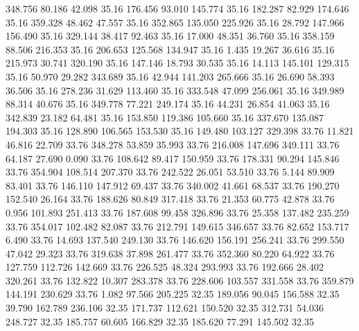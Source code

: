  348.756   80.186   42.098        35.16
 176.456   93.010  145.774        35.16
 182.287   82.929  174.646        35.16
 359.328   48.462   47.557        35.16
 352.865  135.050  225.926        35.16
  28.792  147.966  156.490        35.16
 329.144   38.417   92.463        35.16
  17.000   48.351   36.760        35.16
 358.159   88.506  216.353        35.16
 206.653  125.568  134.947        35.16
   1.435   19.267   36.616        35.16
 215.973   30.741  320.190        35.16
 147.146   18.793   30.535        35.16
  14.113  145.101  129.315        35.16
  50.970   29.282  343.689        35.16
  42.944  141.203  265.666        35.16
  26.690   58.393   36.506        35.16
 278.236   31.629  113.460        35.16
 333.548   47.099  256.061        35.16
 349.989   88.314   40.676        35.16
 349.778   77.221  249.174        35.16
  44.231   26.854   41.063        35.16
 342.839   23.182   64.481        35.16
 153.850  119.386  105.660        35.16
 337.670  135.087  194.303        35.16
 128.890  106.565  153.530        35.16
 149.480  103.127  329.398        33.76
  11.821   46.816   22.709        33.76
 348.278   53.859   35.993        33.76
 216.008  147.696  349.111        33.76
  64.187   27.690    0.090        33.76
 108.642   89.417  150.959        33.76
 178.331   90.294  145.846        33.76
 354.904  108.514  207.370        33.76
 242.522   26.051   53.510        33.76
   5.144   89.909   83.401        33.76
 146.110  147.912   69.437        33.76
 340.002   41.661   68.537        33.76
 190.270  152.540   26.164        33.76
 188.626   80.849  317.418        33.76
  21.353   60.775   42.878        33.76
   0.956  101.893  251.413        33.76
 187.608   99.458  326.896        33.76
  25.358  137.482  235.259        33.76
 354.017  102.482   82.087        33.76
 212.791  149.615  346.657        33.76
  82.652  153.717    6.490        33.76
  14.693  137.540  249.130        33.76
 146.620  156.191  256.241        33.76
 299.550   47.042   29.323        33.76
 319.638   37.898  261.477        33.76
 352.360   80.220   64.922        33.76
 127.759  112.726  142.669        33.76
 226.525   48.324  293.993        33.76
 192.666   28.402  320.261        33.76
 132.822   10.307  283.378        33.76
 228.606  103.557  331.558        33.76
 359.879  144.191  230.629        33.76
   1.082   97.566  205.225        32.35
 189.056   90.045  156.588        32.35
  39.790  162.789  236.106        32.35
 171.737  112.621  150.520        32.35
 312.731   54.036  248.727        32.35
 185.757   60.605  166.829        32.35
 185.620   77.291  145.502        32.35
